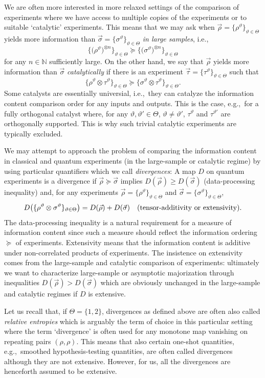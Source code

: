 \documentclass[12pt,a4paper,reqno]{amsart}
\theoremstyle{definition}
\newcommand{\N}{\mathbb N}
\newcommand{\tj}{\vartheta}
\let\originalleft\left
\let\originalright\right
\renewcommand{\left}{\mathopen{}\mathclose\bgroup\originalleft}
\renewcommand{\right}{\aftergroup\egroup\originalright}
\begin{document}
We are often more interested in more relaxed settings of the comparison of experiments where we have access to multiple copies of the experiments or to suitable `catalytic' experiments. This means that we may ask when $\vec{\rho}=\big\{\rho^\tj\big\}_{\tj\in\Theta}$ yields more information than $\vec{\sigma}=\big\{\sigma^\tj\big\}_{\tj\in\Theta}$ {\it in large samples}, i.e.,
$$
\big\{\big(\rho^\tj\big)^{\otimes n}\big\}_{\tj\in\Theta}\succeq\big\{\big(\sigma^\tj\big)^{\otimes n}\big\}_{\tj\in\Theta}
$$
for any $n\in\N$ sufficiently large. On the other hand, we say that $\vec{\rho}$ yields more information than $\vec{\sigma}$ {\it catalytically} if there is an experiment $\vec{\tau}=\big\{\tau^\tj\big\}_{\tj\in\Theta}$ such that
$$
\big\{\rho^\tj\otimes\tau^\tj\big\}_{\tj\in\Theta}\succeq\big\{\sigma^\tj\otimes\tau^\tj\big\}_{\tj\in\Theta}.
$$
Some catalysts are essentially universial, i.e.,\ they can catalyze the information content comparison order for any inputs and outputs. This is the case, e.g.,\ for a fully orthogonal catalyst where, for any $\tj,\tj'\in\Theta$, $\tj\neq\tj'$, $\tau^\tj$ and $\tau^{\tj'}$ are orthogonally supported. This is why such trivial catalytic experiments are typically excluded.

We may attempt to approach the problem of comparing the information content in classical and quantum experiments (in the large-sample or catalytic regime) by using particular quantifiers which we call {\it divergences}: A map $D$ on quantum experiments is a divergence if $\vec{\rho}\succeq\vec{\sigma}$ implies $D(\vec{\rho})\geq D(\vec{\sigma})$ (data-processing inequality) and, for any experiments $\vec{\rho}=\{\rho^\tj\}_{\tj\in\Theta}$ and $\vec{\sigma}=\{\sigma^\tj\}_{\tj\in\Theta}$,
$$
D\left(\{\rho^\tj\otimes\sigma^\tj\}_{\tj\in\Theta}\right)=D(\vec{\rho})+D(\vec{\sigma})\quad\textrm{(tensor-additivity or extensivity)}.
$$
The data-processing inequality is a natural requirement for a measure of information content since such a measure should reflect the information ordering $\succeq$ of experiments. Extensivity means that the information content is additive under non-correlated products of experiments. The insistence on extensivity comes from the large-sample and catalytic comparison of experiments: ultimately we want to characterize large-sample or asymptotic majorization through inequalities $D(\vec{\rho})>D(\vec{\sigma})$ which are obviously unchanged in the large-sample and catalytic regimes if $D$ is extensive.

Let us recall that, if $\Theta=\{1,2\}$, divergences as defined above are often also called {\it relative entropies} which is arguably the term of choice in this particular setting where the term `divergence' is often used for any monotone map vanishing on repeating pairs $(\rho,\rho)$. This means that also certain one-shot quantities, e.g.,\ smoothed hypothesis-testing quantities, are often called divergences although they are not extensive. However, for us, all the divergences are henceforth assumed to be extensive.
\end{document}
